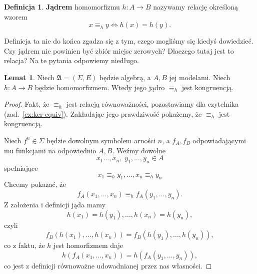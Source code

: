 \documentclass{book}
\theoremstyle{definition}
\newtheorem{definition}{Definicja}[section]
\newtheorem{lemma}{Lemat}[section]
\begin{document}
\begin{definition}
	\textbf{Jądrem} homomorfizmu $h: A \to B$ nazywamy relację określoną wzorem
	\begin{equation}
		x \equiv_h y \iff h(x) = h(y).
	\end{equation}
\end{definition}

Definicja ta nie do końca zgadza się z tym,
	czego mogliśmy się kiedyś dowiedzieć.
Czy jądrem nie powinien być zbiór miejsc zerowych?
Dlaczego tutaj jest to relacja?
Na te pytania odpowiemy niedługo.

\begin{lemma}
	Niech $\mathfrak{A} = (\Sigma, E)$ będzie algebrą, a $A, B$ jej modelami.
	Niech $h: A \to B$ będzie homomorfizmem.
	Wtedy jego jądro $\equiv_h$ jest kongruencją.
\end{lemma}
\begin{proof}
	Fakt,
		że $\equiv_h$ jest relacją równoważności,
		pozostawiamy dla czytelnika (zad.~\ref{ex:ker-equiv}).
	Zakładając jego prawdziwość pokażemy,
		że $\equiv_h$ jest kongruencją.

	Niech $f^n \in \Sigma$ będzie dowolnym symbolem arności $n$,
		a $f_A, f_B$ odpowiadającymi mu funkcjami na odpowiednio $A, B$.
	Weźmy dowolne
	\begin{equation}
		x_1 \dots, x_n,\;y_1, \dots, y_n \in A
	\end{equation}
	spełniające
	\begin{equation}
		x_1 \equiv_h y_1, \dots, x_n \equiv_h y_n
	\end{equation}
	Chcemy pokazać, że
	\begin{equation}
		f_A(x_1, \dots, x_n) \equiv_h f_A(y_1, \dots, y_n).
	\end{equation}
	Z założenia i definicji jąda mamy
	\begin{equation}
		h(x_1) = h(y_1), \dots, h(x_n) = h(y_n),
	\end{equation}
	czyli
	\begin{equation}
		f_B(h(x_1), \dots, h(x_n)) = f_B(h(y_1), \dots, h(y_n)),
	\end{equation}
	co z faktu, że $h$ jest homorfizmem daje
	\begin{equation}
		h(f_A(x_1, \dots, x_n)) = h(f_A(y_1, \dots, y_n)),
	\end{equation}
	co jest z definicji równoważne udowadnianej przez nas własności.
\end{proof}
\end{document}
